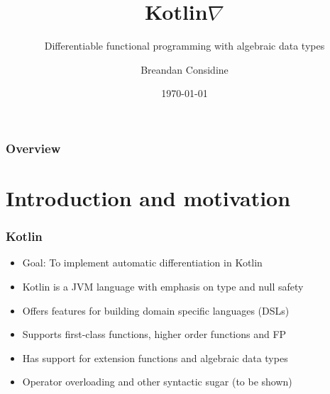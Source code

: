 \documentclass{beamer}
\title{Kotlin\texorpdfstring{$\nabla$}{}}
\subtitle{Differentiable functional programming with algebraic data types}
\author{Breandan Considine}
\institute[UdeM]{
Universit\'e de Montr\'eal \\
\medskip
\textit{breandan.considine@umontreal.ca}
}
\date{\today}
\begin{document}
    \begin{frame}
        \titlepage
    \end{frame}

    \begin{frame}
        \frametitle{Overview}
        \tableofcontents
    \end{frame}

    \section{Introduction and motivation}\label{sec:first-section}

    \begin{frame}
        \frametitle{Kotlin}
        \begin{itemize}
            \item Goal: To implement automatic differentiation in Kotlin
            \item Kotlin is a JVM language with emphasis on type and null safety
            \item Offers features for building domain specific languages (DSLs)
            \item Supports first-class functions, higher order functions and FP
            \item Has support for extension functions and algebraic data types
            \item Operator overloading and other syntactic sugar (to be shown)
        \end{itemize}
    \end{frame}
\end{document}
